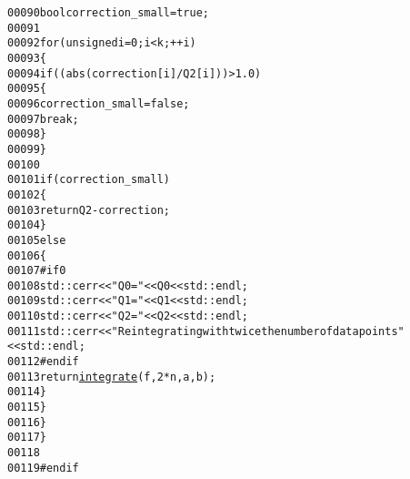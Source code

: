 \begin{footnotesize}
\begin{alltt}
00090             \textcolor{keywordtype}{bool} correction\_small = \textcolor{keyword}{true};
00091 
00092             \textcolor{keywordflow}{for} (\textcolor{keywordtype}{unsigned} i = 0 ; i < k ; ++i)
00093             \{
00094                 \textcolor{keywordflow}{if} ((abs(correction[i] / Q2[i])) > 1.0)
00095                 \{
00096                     correction\_small = \textcolor{keyword}{false};
00097                     \textcolor{keywordflow}{break};
00098                 \}
00099             \}
00100 
00101             \textcolor{keywordflow}{if} (correction\_small)
00102             \{
00103                 \textcolor{keywordflow}{return} Q2 - correction;
00104             \}
00105             \textcolor{keywordflow}{else}
00106             \{
00107 \textcolor{preprocessor}{#if 0}
00108 \textcolor{preprocessor}{}                std::cerr << \textcolor{stringliteral}{"Q0 = "} << Q0 << std::endl;
00109                 std::cerr << \textcolor{stringliteral}{"Q1 = "} << Q1 << std::endl;
00110                 std::cerr << \textcolor{stringliteral}{"Q2 = "} << Q2 << std::endl;
00111                 std::cerr << \textcolor{stringliteral}{"Reintegrating with twice the number of data points"
      } << std::endl;
00112 \textcolor{preprocessor}{#endif}
00113 \textcolor{preprocessor}{}                \textcolor{keywordflow}{return} \hyperlink{namespaceeos_aa97e022b32760a5d657bc35b9151efb8}{integrate}(f, 2 * n, a, b);
00114             \}
00115         \}
00116     \}
00117 \}
00118 
00119 \textcolor{preprocessor}{#endif}
\end{alltt}\end{footnotesize}
